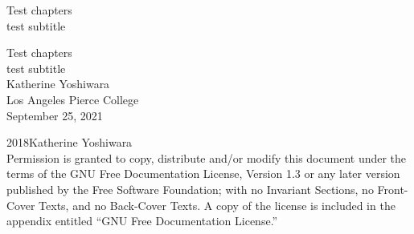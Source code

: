 \documentclass[oneside,10pt,]{book}
\newcommand{\titlepagefont}{\relax}
\numberwithin{equation}{section}
\begin{document}
\frontmatter
\thispagestyle{empty}
{\titlepagefont\centering
\vspace*{0.28\textheight}
{\Huge Test chapters}\\[2\baselineskip]
{\LARGE test subtitle}\\
}
\clearpage
\thispagestyle{empty}
{\titlepagefont\centering
\vspace*{0.14\textheight}
{\Huge Test chapters}\\[\baselineskip]
{\LARGE test subtitle}\\[3\baselineskip]
{\Large Katherine Yoshiwara}\\[0.5\baselineskip]
{\Large Los Angeles Pierce College}\\[3\baselineskip]
{\Large September 25, 2021}\\}
\clearpage
\thispagestyle{empty}
\hypertarget{g:colophon:idp1}{}
\noindent\textcopyright{}2018\quad{}Katherine Yoshiwara\\[0.5\baselineskip]
Permission is granted to copy, distribute and\slash{}or modify this document under the terms of the GNU Free Documentation License, Version 1.3 or any later version published by the Free Software Foundation; with no Invariant Sections, no Front-Cover Texts, and no Back-Cover Texts.  A copy of the license is included in the appendix entitled ``GNU Free Documentation License.''\par\medskip
{}
\null\clearpage
%
%
\typeout{************************************************}
\typeout{************************************************}
%
\end{document}
